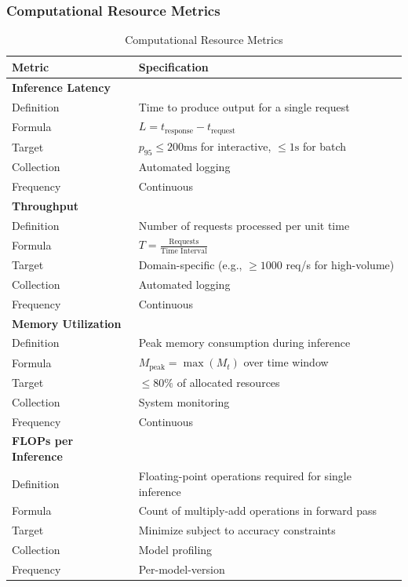\subsubsection{Computational Resource Metrics}

\begin{table}[!htbp]
\centering
\caption{Computational Resource Metrics}
\label{tab:compute_metrics}
\small
\begin{tabularx}{\linewidth}{@{}l X@{}}
\toprule
\textbf{Metric} & \textbf{Specification} \\
\midrule
\textbf{Inference Latency} & \\
Definition & Time to produce output for a single request \\
Formula & $L = t_{\text{response}} - t_{\text{request}}$ \\
Target & $p_{95} \leq 200\text{ms}$ for interactive, $\leq 1\text{s}$ for batch \\
Collection & Automated logging \\
Frequency & Continuous \\
\addlinespace

\textbf{Throughput} & \\
Definition & Number of requests processed per unit time \\
Formula & $T = \frac{\text{Requests}}{\text{Time Interval}}$ \\
Target & Domain-specific (e.g., $\geq 1000$ req/s for high-volume) \\
Collection & Automated logging \\
Frequency & Continuous \\
\addlinespace

\textbf{Memory Utilization} & \\
Definition & Peak memory consumption during inference \\
Formula & $M_{\text{peak}} = \max(M_t)$ over time window \\
Target & $\leq 80\%$ of allocated resources \\
Collection & System monitoring \\
Frequency & Continuous \\
\addlinespace

\textbf{FLOPs per Inference} & \\
Definition & Floating-point operations required for single inference \\
Formula & Count of multiply-add operations in forward pass \\
Target & Minimize subject to accuracy constraints \\
Collection & Model profiling \\
Frequency & Per-model-version \\
\bottomrule
\end{tabularx}
\end{table}

